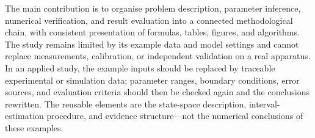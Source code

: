 \begin{englishabstract}
The main contribution is to organise problem description, parameter inference, numerical verification, and result evaluation into a connected methodological chain, with consistent presentation of formulas, tables, figures, and algorithms. The study remains limited by its example data and model settings and cannot replace measurements, calibration, or independent validation on a real apparatus. In an applied study, the example inputs should be replaced by traceable experimental or simulation data; parameter ranges, boundary conditions, error sources, and evaluation criteria should then be checked again and the conclusions rewritten. The reusable elements are the state-space description, interval-estimation procedure, and evidence structure—not the numerical conclusions of these examples.


\end{englishabstract}

